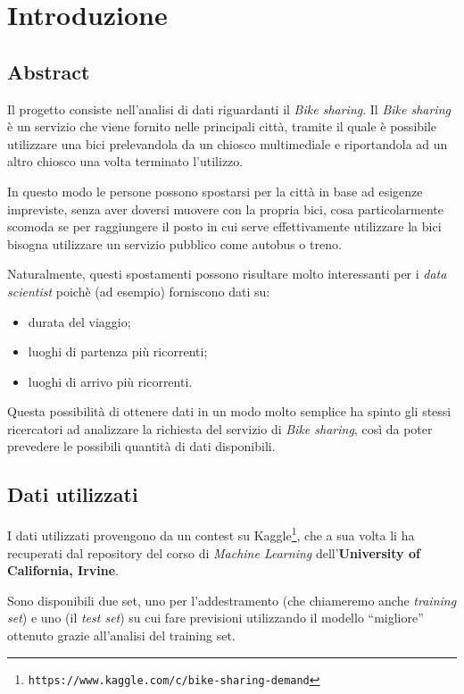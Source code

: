 \section{Introduzione}

\subsection{Abstract}
Il progetto consiste nell'analisi di dati riguardanti il \emph{Bike sharing}.
Il \emph{Bike sharing} è un servizio che viene fornito nelle principali città,
tramite il quale è possibile utilizzare una bici prelevandola da un chiosco
multimediale e riportandola ad un altro chiosco una volta terminato l'utilizzo.

In questo modo le persone possono spostarsi per la città in base ad esigenze
impreviste, senza aver doversi muovere con la propria bici, cosa
particolarmente scomoda se per raggiungere il posto in cui serve
effettivamente utilizzare la bici bisogna utilizzare un servizio pubblico come
autobus o treno.

Naturalmente, questi spostamenti possono risultare molto interessanti per i
\emph{data scientist} poichè (ad esempio) forniscono dati su:

\begin{itemize}
\item durata del viaggio;
\item luoghi di partenza più ricorrenti;
\item luoghi di arrivo più ricorrenti.
\end{itemize}

Questa possibilità di ottenere dati in un modo molto semplice ha spinto gli
stessi ricercatori ad analizzare la richiesta del servizio di \emph{Bike
sharing}, così da poter prevedere le possibili quantità di dati disponibili.

\subsection{Dati utilizzati}\label{sec:intro-dati}

I dati utilizzati provengono da un contest su
Kaggle\footnote{\texttt{https://www.kaggle.com/c/bike-sharing-demand}},
che a sua volta li ha recuperati dal repository del corso di
\emph{Machine Learning} dell'\textbf{University of California, Irvine}.

Sono disponibili due set, uno per l'addestramento (che chiameremo anche
\emph{training set}) e uno (il \emph{test set}) su cui fare previsioni
utilizzando il modello ``migliore'' ottenuto grazie all'analisi del training
set.

